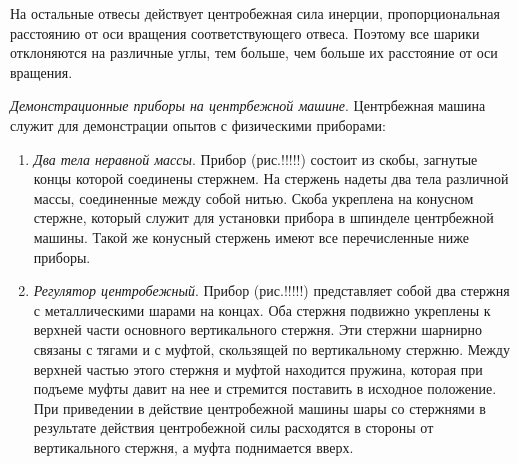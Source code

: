 \documentclass[14pt,a4paper,oneside]{extarticle}	%
\begin{document}
На остальные отвесы действует центробежная сила инерции, пропорциональная расстоянию от оси вращения соответствующего отвеса.
Поэтому все шарики отклоняются на различные углы, тем больше, чем больше их расстояние от оси вращения.

\textit{Демонстрационные приборы на центрбежной машине}. 
Центрбежная машина служит для демонстрации опытов с физическими приборами:
\begin{enumerate} 
	\item \textit{Два тела неравной массы}. Прибор (рис.!!!!!) состоит из скобы, загнутые концы которой соединены стержнем. На стержень надеты два тела различной массы, соединенные между собой нитью. Скоба укреплена на конусном стержне, который служит для установки прибора в шпинделе центрбежной машины. Такой же конусный стержень имеют все перечисленные ниже приборы.
	\item \textit{Регулятор центробежный}. Прибор (рис.!!!!!) представляет собой два стержня с металлическими шарами на концах.
	Оба стержня подвижно укреплены к верхней части основного вертикального стержня. Эти стержни шарнирно связаны с тягами и с муфтой, скользящей по вертикальному стержню. Между верхней частью этого стержня и муфтой находится пружина, которая при подъеме муфты давит на нее и стремится поставить в исходное положение.
	При приведении в действие центробежной машины шары со стержнями в результате действия центробежной силы расходятся в стороны от вертикального стержня, а муфта поднимается вверх.
	\end{enumerate}
\end{document}
